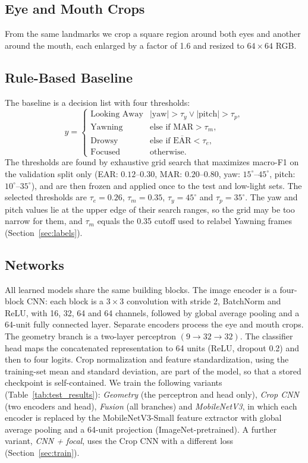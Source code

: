 \documentclass[conference]{IEEEtran}
\begin{document}
\subsection{Eye and Mouth Crops}\label{sec:crops}
From the same landmarks we crop a square region around both eyes and another around the mouth, each enlarged by a factor of 1.6 and resized to $64 \times 64$ RGB.

\subsection{Rule-Based Baseline}\label{sec:rule}
The baseline is a decision list with four thresholds:
\begin{equation}
\hat{y} =
\begin{cases}
\text{Looking Away} & | \text{yaw} | > \tau_y \lor |\text{pitch}| > \tau_p, \\
\text{Yawning} & \text{else if } \mathrm{MAR} > \tau_m, \\
\text{Drowsy} & \text{else if } \overline{\mathrm{EAR}} < \tau_e, \\
\text{Focused} & \text{otherwise}.
\end{cases}
\label{eq:driver_state}
\end{equation}
The thresholds are found by exhaustive grid search that maximizes macro-F1 on the validation split only 
(EAR: $0.12$--$0.30$, MAR: $0.20$--$0.80$,
yaw: $15^\circ$--$45^\circ$,
pitch: $10^\circ$--$35^\circ$),
and are then frozen and applied once to the test and low-light sets. The selected thresholds are $\tau_e=0.26$, $\tau_m=0.35$, $\tau_y=45^\circ$ and $\tau_p=35^\circ$. The yaw and pitch values lie at the upper edge of their search ranges, so the grid may be too narrow for them, and $\tau_m$ equals the 0.35 cutoff used to relabel Yawning frames (Section~\ref{sec:labels}).

\subsection{Networks}\label{sec:networks}
All learned models share the same building blocks. The image encoder is a four-block CNN: each block is a $3 \times 3$ convolution with stride 2, BatchNorm and ReLU, with 16, 32, 64 and 64 channels, followed by global average pooling and a 64-unit fully connected layer. Separate encoders process the eye and mouth crops. The geometry branch is a two-layer perceptron $(9 \rightarrow 32 \rightarrow 32)$.
The classifier head maps the concatenated representation to 64 units (ReLU, dropout 0.2) and then to four logits. Crop normalization and feature standardization, using the training-set mean and standard deviation, are part of the model, so that a stored checkpoint is self-contained. We train the following variants (Table~\ref{tab:test_results}):
\textit{Geometry} (the perceptron and head only),
\textit{Crop CNN} (two encoders and head),
\textit{Fusion} (all branches) and
\textit{MobileNetV3}, in which each encoder is replaced by
the MobileNetV3-Small \cite{howard2019} feature extractor with
global average pooling and a 64-unit projection
(ImageNet-pretrained).
A further variant, \textit{CNN + focal}, uses the Crop CNN
with a different loss (Section~\ref{sec:train}).
\end{document}

